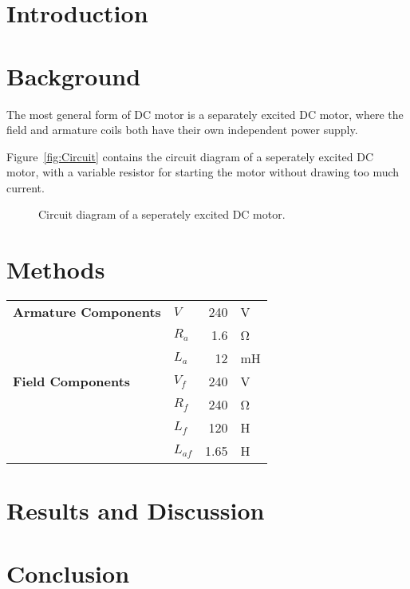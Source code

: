 \documentclass[a4paper,10pt,twocolumn]{article}
\begin{document}
\printnomenclature

\twocolumn
{}

\section{Introduction}


\section{Background}

The most general form of DC motor is a separately excited DC motor, where the 
field and armature coils both have their own independent power supply.

Figure~\vref{fig:Circuit} contains the circuit diagram of a seperately excited 
DC motor, with a variable resistor for starting the motor without drawing too 
much current.

\begin{figure}[h]
    \centering
    \def\svgwidth{0.48\textwidth}
    
    \caption{Circuit diagram of a seperately excited DC motor.}
    \label{fig:Circuit}
\end{figure}

\section{Methods}

\begin{table}
    \begin{tabular}{llrl}
        \toprule
        \textbf{Armature Components}
        & $V$      & 240 & \si{\volt} \\
        & $R_a$    & 1.6 & \si{\ohm} \\
        & $L_a$    & 12  & \si{\milli\henry} \\
        \midrule
        \textbf{Field Components}
        & $V_f$    & 240  & \si{\volt} \\
        & $R_f$    & 240  & \si{\ohm} \\
        & $L_f$    & 120  & \si{\henry} \\
        & $L_{af}$ & 1.65 & \si{\henry} \\
        \bottomrule
        
        
    \end{tabular}
    
\end{table}

\section{Results and Discussion}


\section{Conclusion}


\printbibliography

\clearpage

\end{document}
